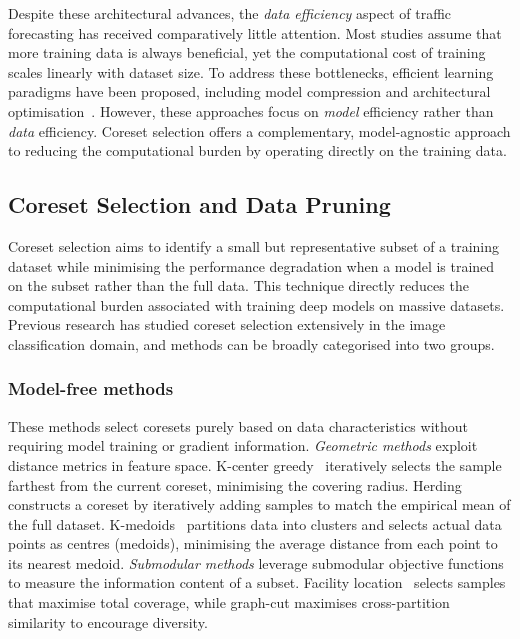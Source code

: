 \documentclass[journal]{IEEEtran}
\begin{document}
Despite these architectural advances, the \emph{data efficiency}
aspect of traffic forecasting has received comparatively little
attention.
Most studies assume that more training data is always beneficial,
yet the computational cost of training scales linearly with dataset
size.
To address these bottlenecks, efficient learning paradigms have been
proposed, including model compression and architectural
optimisation~\cite{zheng_lightcast_2024, zhang_efficient_2025}.
However, these approaches focus on \emph{model} efficiency rather
than \emph{data} efficiency.
Coreset selection offers a complementary, model-agnostic approach
to reducing the computational burden by operating directly on the
training data.


\subsection{Coreset Selection and Data Pruning}
\label{sec:related-coreset}

Coreset selection aims to identify a small but representative subset
of a training dataset while minimising the performance degradation
when a model is trained on the subset rather than the full data.
This technique directly reduces the computational burden associated
with training deep models on massive datasets.
Previous research has studied coreset selection extensively in the
image classification domain, and methods can be broadly categorised
into two groups.

\subsubsection{Model-free methods}
These methods select coresets purely based on data characteristics
without requiring model training or gradient information.
\emph{Geometric methods} exploit distance metrics in feature space.
K-center greedy~\cite{sener_active_2018} iteratively selects the
sample farthest from the current coreset, minimising the covering
radius.
Herding~\cite{welling_herding_2009} constructs a coreset by
iteratively adding samples to match the empirical mean of the
full dataset.
K-medoids~\cite{kaufmann_clustering_1987} partitions data into
clusters and selects actual data points as centres (medoids),
minimising the average distance from each point to its nearest
medoid.
\emph{Submodular methods} leverage submodular objective functions
to measure the information content of a subset.
Facility location~\cite{iyer_submodular_2021,
kothawade_prism_2022} selects samples that maximise total coverage,
while graph-cut maximises cross-partition similarity to encourage
diversity.
\end{document}

